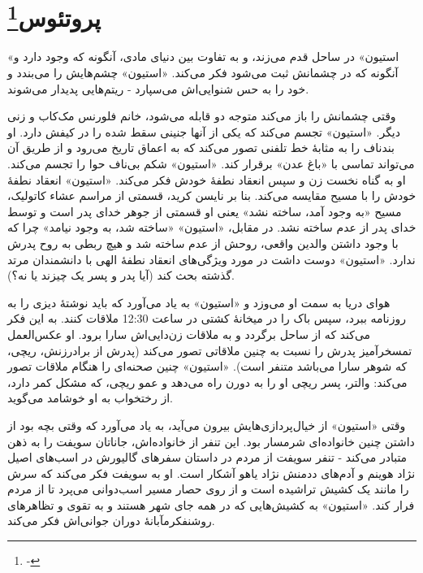 \documentclass[12pt]{book}
\newcommand{\noun}[1]{«{#1}»}
\begin{document}
    \chapter[پروتئوس]{پروتئوس\protect\footnote{-}}\label{ep:3}
    \noun{استیون} در ساحل قدم می‌زند، و به تفاوت بین دنیای مادی، آنگونه که وجود دارد و آنگونه که در چشمانش ثبت می‌شود فکر می‌کند. \noun{استیون} چشم‌هایش را می‌بندد و خود را به حس شنوایی‌اش می‌سپارد - ریتم‌هایی پدیدار می‌شوند.

    وقتی چشمانش را باز می‌کند متوجه دو قابله می‌شود، خانم فلورنس مک‌کاب و زنی دیگر. \noun{استیون} تجسم می‌کند که یکی از آنها جنینی سقط شده را در کیفش دارد. او بندناف را به مثابۀ خط تلفنی تصور می‌کند که به اعماق تاریخ می‌رود و از طریق آن می‌تواند تماسی با «باغ عدن» برقرار کند. \noun{استیون} شکم بی‌ناف حوا را تجسم می‌کند. او به گناه نخست زن و سپس انعقاد نطفۀ خودش فکر می‌کند. \noun{استیون} انعقاد نطفۀ خودش را با مسیح مقایسه می‌کند. بنا بر نایسن کرید، قسمتی از مراسم عشاء کاتولیک، مسیح «به وجود آمد، ساخته نشد» یعنی او قسمتی از جوهر خدای پدر است و توسط خدای پدر از عدم ساخته نشد. در مقابل، \noun{استیون} «ساخته شد، به وجود نیامد» چرا که با وجود داشتن والدین واقعی، روحش از عدم ساخته شد و هیچ ربطی به روح پدرش ندارد. \noun{استیون} دوست داشت در مورد ویژگی‌های انعقاد نطفۀ الهی با دانشمندان مرتد گذشته بحث کند (آیا پدر و پسر یک چیزند یا نه؟).

    هوای دریا به سمت او می‌وزد و \noun{استیون} به یاد می‌آورد که باید نوشتۀ دیزی را به روزنامه ببرد، سپس باک را در میخانۀ کشتی در ساعت 12:30 ملاقات کنند. به این فکر می‌کند که از ساحل برگردد و به ملاقات زن‌دایی‌اش سارا برود. او عکس‌العمل تمسخرآمیز پدرش را نسبت به چنین ملاقاتی تصور می‌کند (پدرش از برادرزنش، ریچی، که شوهر سارا می‌باشد متنفر است). \noun{استیون} چنین صحنه‌ای را هنگام ملاقات تصور می‌کند: والتر، پسر ریچی او را به دورن راه می‌دهد و عمو ریچی، که مشکل کمر دارد، از رختخواب به او خوشامد می‌گوید.

    وقتی \noun{استیون} از خیال‌پردازی‌هایش بیرون می‌آید، به یاد می‌آورد که وقتی بچه بود از داشتن چنین خانواده‌ای شرمسار بود. این تنفر از خانواده‌اش، جاناتان سویفت را به ذهن متبادر می‌کند - تنفر سویفت از مردم در داستان سفرهای گالیورش در اسب‌های اصیل نژاد هوینم و آدم‌های ددمنش نژاد یاهو آشکار است. او به سویفت فکر می‌کند که سرش را مانند یک کشیش تراشیده است و از روی حصار مسیر اسب‌دوانی می‌پرد تا از مردم فرار کند. \noun{استیون} به کشیش‌هایی که در همه جای شهر هستند و به تقوی و تظاهرهای روشنفکرمآبانۀ دوران جوانی‌اش فکر می‌کند.
\end{document}
